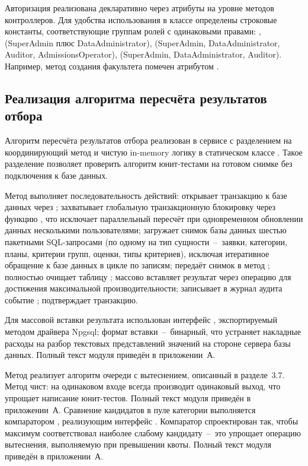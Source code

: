 Авторизация реализована декларативно через атрибуты на уровне методов контроллеров.
Для удобства использования в классе  определены строковые константы, соответствующие группам ролей с одинаковыми правами: ,  (SuperAdmin плюс DataAdministrator),  (SuperAdmin, DataAdministrator, Auditor, AdmissionsOperator),  (SuperAdmin, DataAdministrator, Auditor).
Например, метод создания факультета помечен атрибутом \code{[Authorize(Roles = UserRoles.WriteStructure)]}.

\subsection{Реализация алгоритма пересчёта результатов отбора}

Алгоритм пересчёта результатов отбора реализован в сервисе  с разделением на координирующий метод  и чистую in-memory логику в статическом классе .
Такое разделение позволяет проверить алгоритм юнит-тестами на готовом снимке без подключения к базе данных.

Метод  выполняет последовательность действий: открывает транзакцию к базе данных через ; захватывает глобальную транзакционную блокировку через функцию , что исключает параллельный пересчёт при одновременном обновлении данных несколькими пользователями; загружает снимок базы данных шестью пакетными SQL-запросами (по одному на тип сущности~--~заявки, категории, планы, критерии групп, оценки, типы критериев), исключая итеративное обращение к базе данных в цикле по записям; передаёт снимок в метод ; полностью очищает таблицу ; массово вставляет результат через операцию  для достижения максимальной производительности; записывает в журнал аудита событие ; подтверждает транзакцию.

Для массовой вставки результата использован интерфейс , экспортируемый методом  драйвера Npgsql; формат вставки~--~бинарный, что устраняет накладные расходы на разбор текстовых представлений значений на стороне сервера базы данных.
Полный текст модуля  приведён в приложении~А.

Метод  реализует алгоритм очереди с вытеснением, описанный в разделе~3.7.
Метод чист: на одинаковом входе всегда производит одинаковый выход, что упрощает написание юнит-тестов.
Полный текст модуля  приведён в приложении~А.
Сравнение кандидатов в пуле категории выполняется компаратором , реализующим интерфейс .
Компаратор спроектирован так, чтобы максимум  соответствовал наиболее слабому кандидату~--~это упрощает операцию вытеснения, выполняемую при превышении квоты.
Полный текст модуля  приведён в приложении~А.

